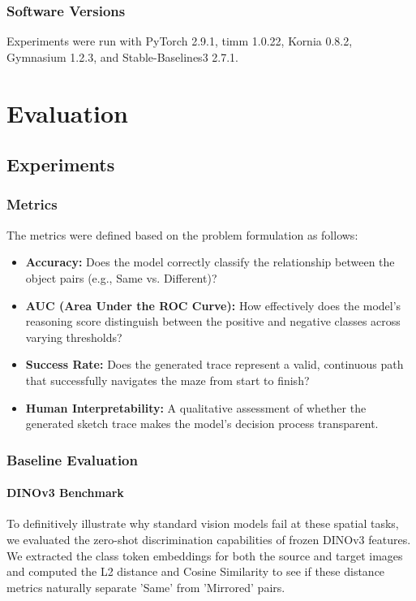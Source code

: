 \documentclass{l4proj}
\begin{document}
\subsection{Software Versions}
Experiments were run with PyTorch 2.9.1, timm 1.0.22, Kornia 0.8.2, Gymnasium 1.2.3, and Stable-Baselines3 2.7.1.



\chapter{Evaluation}

\section{Experiments}

\subsection{Metrics}
The metrics were defined based on the problem formulation as follows:

\begin{itemize}
    \item \textbf{Accuracy:} Does the model correctly classify the relationship between the object pairs (e.g., Same vs. Different)?
    \item \textbf{AUC (Area Under the ROC Curve):} How effectively does the model's reasoning score distinguish between the positive and negative classes across varying thresholds?
    \item \textbf{Success Rate:} Does the generated trace represent a valid, continuous path that successfully navigates the maze from start to finish?
    \item \textbf{Human Interpretability:} A qualitative assessment of whether the generated sketch trace makes the model's decision process transparent.
\end{itemize}


\subsection{Baseline Evaluation}
\subsubsection{DINOv3 Benchmark}
To definitively illustrate why standard vision models fail at these spatial tasks, we evaluated the zero-shot discrimination capabilities of frozen DINOv3 features. We extracted the class token embeddings for both the source and target images and computed the L2 distance and Cosine Similarity to see if these distance metrics naturally separate 'Same' from 'Mirrored' pairs.
\end{document}
